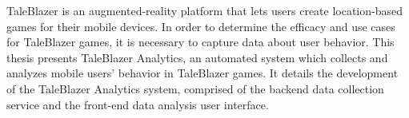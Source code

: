 % 
% 
%
TaleBlazer is an augmented-reality platform that lets users create location-based games for their mobile devices. In order to determine the efficacy and use cases for TaleBlazer games, it is necessary to capture data about user behavior. This thesis presents TaleBlazer Analytics, an automated system which collects and analyzes mobile users' behavior in TaleBlazer games. It details the development of the TaleBlazer Analytics system, comprised of the backend data collection service and the front-end data analysis user interface. 

 

